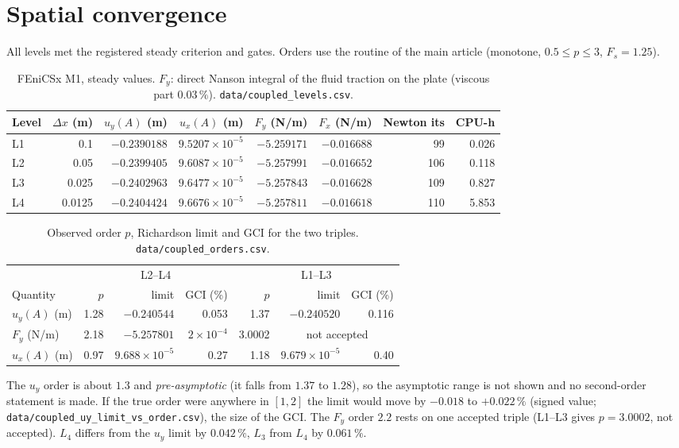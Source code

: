 \documentclass[sn-mathphys,Numbered]{sn-jnl}
\begin{document}
\section{Spatial convergence}\label{sec:cv_spatial}
All levels met the registered steady criterion and gates. Orders use the routine of the main article (monotone, $0.5\le p\le3$, $F_s=1.25$).
\begin{table}[htbp]
\centering
\caption{FEniCSx M1, steady values. $F_y$: direct Nanson integral of the fluid traction on the plate (viscous part $0.03\,\%$). \texttt{data/coupled\_levels.csv}.}\label{tab:cv_levels}
\small
\begin{tabular}{@{}lrrrrrrr@{}}
\toprule
Level & $\Delta x$ (m) & $u_y(A)$ (m) & $u_x(A)$ (m) & $F_y$ (N/m) & $F_x$ (N/m) & Newton its & CPU-h \\
\midrule
L1 & 0.1 & $-0.2390188$ & $9.5207\!\times\!10^{-5}$ & $-5.259171$ & $-0.016688$ & 99 & 0.026 \\
L2 & 0.05 & $-0.2399405$ & $9.6087\!\times\!10^{-5}$ & $-5.257991$ & $-0.016652$ & 106 & 0.118 \\
L3 & 0.025 & $-0.2402963$ & $9.6477\!\times\!10^{-5}$ & $-5.257843$ & $-0.016628$ & 109 & 0.827 \\
L4 & 0.0125 & $-0.2404424$ & $9.6676\!\times\!10^{-5}$ & $-5.257811$ & $-0.016618$ & 110 & 5.853 \\
\bottomrule
\end{tabular}
\end{table}
\begin{table}[htbp]
\centering
\caption{Observed order $p$, Richardson limit and GCI for the two triples. \texttt{data/coupled\_orders.csv}.}\label{tab:cv_orders}
\small
\begin{tabular}{@{}lrrrrrr@{}}
\toprule
 & \multicolumn{3}{c}{L2--L4} & \multicolumn{3}{c}{L1--L3} \\
\cmidrule(r){2-4}\cmidrule(l){5-7}
Quantity & $p$ & limit & GCI (\%) & $p$ & limit & GCI (\%) \\
\midrule
$u_y(A)$ (m) & 1.28 & $-0.240544$ & 0.053 & 1.37 & $-0.240520$ & 0.116 \\
$F_y$ (N/m) & 2.18 & $-5.257801$ & $2\times10^{-4}$ & 3.0002 & \multicolumn{2}{c}{not accepted} \\
$u_x(A)$ (m) & 0.97 & $9.688\!\times\!10^{-5}$ & 0.27 & 1.18 & $9.679\!\times\!10^{-5}$ & 0.40 \\
\bottomrule
\end{tabular}
\end{table}
The $u_y$ order is about $1.3$ and \emph{pre-asymptotic} (it falls from $1.37$ to $1.28$), so the asymptotic range is not shown and no second-order statement is made. If the true order were anywhere in $[1,2]$ the limit would move by $-0.018$ to $+0.022\,\%$ (signed value; \texttt{data/coupled\_uy\_limit\_vs\_order.csv}), the size of the GCI. The $F_y$ order $2.2$ rests on one accepted triple (L1--L3 gives $p=3.0002$, not accepted). $L_4$ differs from the $u_y$ limit by $0.042\,\%$, $L_3$ from $L_4$ by $0.061\,\%$.
\end{document}
